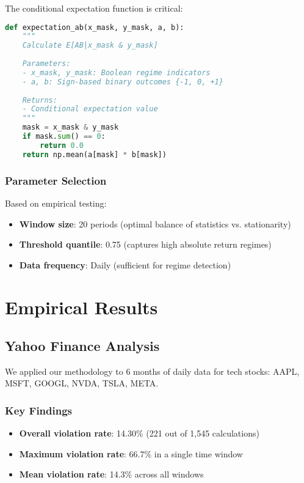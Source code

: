 \documentclass[11pt,a4paper]{article}
\begin{document}
The conditional expectation function is critical:

\begin{lstlisting}[language=Python]
def expectation_ab(x_mask, y_mask, a, b):
    """
    Calculate E[AB|x_mask & y_mask]
    
    Parameters:
    - x_mask, y_mask: Boolean regime indicators
    - a, b: Sign-based binary outcomes {-1, 0, +1}
    
    Returns:
    - Conditional expectation value
    """
    mask = x_mask & y_mask
    if mask.sum() == 0:
        return 0.0
    return np.mean(a[mask] * b[mask])
\end{lstlisting}

\subsubsection{Parameter Selection}

Based on empirical testing:
\begin{itemize}
    \item \textbf{Window size}: 20 periods (optimal balance of statistics vs. stationarity)
    \item \textbf{Threshold quantile}: 0.75 (captures high absolute return regimes)
    \item \textbf{Data frequency}: Daily (sufficient for regime detection)
\end{itemize}

\section{Empirical Results}

\subsection{Yahoo Finance Analysis}

We applied our methodology to 6 months of daily data for tech stocks: AAPL, MSFT, GOOGL, NVDA, TSLA, META.

\subsubsection{Key Findings}

\begin{itemize}
    \item \textbf{Overall violation rate}: 14.30\% (221 out of 1,545 calculations)
    \item \textbf{Maximum violation rate}: 66.7\% in a single time window
    \item \textbf{Mean violation rate}: 14.3\% across all windows
\end{itemize}
\end{document}
